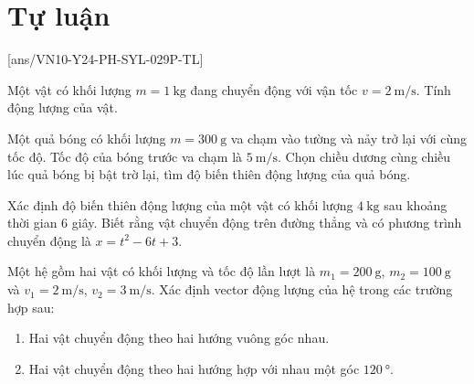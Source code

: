 \section{Tự luận}
\setcounter{ex}{0}
[ans/VN10-Y24-PH-SYL-029P-TL]
\begin{ex}
	Một vật có khối lượng $m=\SI{1}{\kilogram}$ đang chuyển động với vận tốc $v=\SI{2}{\meter/\second}$. Tính động lượng của vật.
\end{ex}
\begin{ex}
Một quả bóng có khối lượng $m=\SI{300}{\gram}$ va chạm vào tường và nảy trở lại với cùng tốc độ. Tốc độ của bóng trước va chạm là $\SI{5}{\meter/\second}$. Chọn chiều dương cùng chiều lúc quả bóng bị bật trờ lại, tìm độ biến thiên động lượng của quả bóng.	
\end{ex}
\begin{ex}
Xác định độ biến thiên động lượng của một vật có khối lượng $\SI{4}{\kilogram}$ sau khoảng thời gian 6 giây. Biết rằng vật chuyển động trên đường thẳng và có phương trình chuyển động là $x=t^2-6t+3$.	
\end{ex}
\begin{ex}
Một hệ gồm hai vật có khối lượng và tốc độ lần lượt là $m_1=\SI{200}{\gram}$, $m_2=\SI{100}{\gram}$ và $v_1=\SI{2}{\meter/\second}$, $v_2=\SI{3}{\meter/\second}$. Xác định vector động lượng của hệ trong các trường hợp sau:
\begin{enumerate}[label=\alph*)]
	\item Hai vật chuyển động theo hai hướng vuông góc nhau.
	\item Hai vật chuyển động theo hai hướng hợp với nhau một góc $\SI{120}{\degree}$.
\end{enumerate}	
\end{ex}
